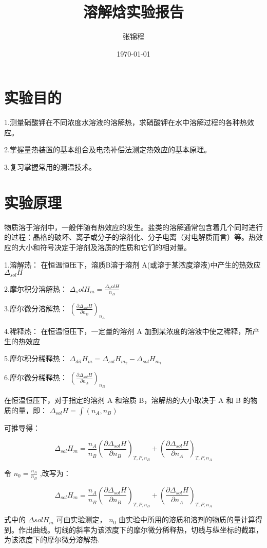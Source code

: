 \documentclass[4pt,a4papper]{article}
\title{\zihao{-2}\textbf{溶解焓实验报告}}
\author{张锦程}
\date{\today}
\begin{document}
\maketitle

\section{实验目的}
1.测量硝酸钾在不同浓度水溶液的溶解热，求硝酸钾在水中溶解过程的各种热效应。

2.掌握量热装置的基本组合及电热补偿法测定热效应的基本原理。

3.复习掌握常用的测温技术。 

\section{实验原理}
物质溶于溶剂中，一般伴随有热效应的发生。盐类的溶解通常包含着几个同时进行的过程：晶格的破坏、离子或分子的溶剂化、分子电离（对电解质而言）等。热效应的大小和符号决定于溶剂及溶质的性质和它们的相对量。 

1.溶解热： 在恒温恒压下，溶质B溶于溶剂 A(或溶于某浓度溶液)中产生的热效应 $\Delta_{sol} H$

2.摩尔积分溶解热： $\Delta_sol H_m = \frac{\Delta_sol H}{n_B}$

3.摩尔微分溶解热： $(\frac{\partial \Delta_{sol}H}{\partial n_B})_{n_A}$

4.稀释热： 在恒温恒压下，一定量的溶剂 A 加到某浓度的溶液中使之稀释，所产生的热效应

5.摩尔积分稀释热： $\Delta_{dil}H_m = \Delta_{sol}H_{m_2} - \Delta_{sol}H_{m_1}$

6.摩尔微分稀释热： $(\frac{\partial \Delta_{sol}H}{\partial n_A})_{n_B}$

在恒温恒压下，对于指定的溶剂 A 和溶质 B，溶解热的大小取决于 A 和 B 的物质的量，即：  $\Delta_{sol}H = \int (n_A, n_B)$

可推导得：

$$\Delta_{sol}H_m=\frac{n_A}{n_B}(\frac{\partial \Delta_{sol}H}{\partial n_B})_{T,P,n_B} + (\frac{\partial \Delta_{sol}H}{\partial n_A})_{T,P,n_A}$$


令 $n_0 = \frac{n_A}{n_B}$ ,改写为：

$$\Delta_{sol}H_m=\frac{n_A}{n_B}(\frac{\partial \Delta_{sol}H}{\partial n_B})_{T,P,n_B} + (\frac{\partial \Delta_{sol}H}{\partial n_A})_{T,P,n_A}$$

式中的 $\Delta{sol}H_m$ 可由实验测定， $n_0$ 由实验中所用的溶质和溶剂的物质的量计算得到。作出曲线。切线的斜率为该浓度下的摩尔微分稀释热，切线与纵坐标的截距，为该浓度下的摩尔微分溶解热.
\end{document}

